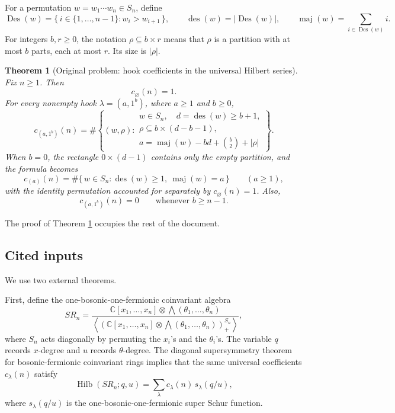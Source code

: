\documentclass[12pt]{article}
\newtheorem{theorem}{Theorem}
\DeclareMathOperator{\Hilb}{Hilb}
\DeclareMathOperator{\Des}{Des}
\DeclareMathOperator{\des}{des}
\DeclareMathOperator{\maj}{maj}
\begin{document}
For a permutation \(w=w_1\cdots w_n\in S_n\), define
\[
\Des(w)=\{\,i\in\{1,\ldots,n-1\}:w_i>w_{i+1}\,\},
\qquad
\des(w)=|\Des(w)|,
\qquad
\maj(w)=\sum_{i\in\Des(w)}i.
\]
For integers \(b,r\ge 0\), the notation \(\rho\subseteq b\times r\) means that \(\rho\) is a partition with at most \(b\) parts, each at most \(r\).  Its size is \(|\rho|\).

\begin{theorem}[Original problem: hook coefficients in the universal Hilbert series]\label{thm:main}
Fix \(n\ge 1\).  Then
\[
c_{\varnothing}(n)=1.
\]
For every nonempty hook \(\lambda=(a,1^b)\), where \(a\ge 1\) and \(b\ge 0\),
\[
\boxed{
c_{(a,1^b)}(n)
=
\#\left\{
(w,\rho):
\begin{array}{l}
w\in S_n,\quad d=\des(w)\ge b+1,\\[2pt]
\rho\subseteq b\times(d-b-1),\\[2pt]
a=\maj(w)-bd+\binom{b}{2}+|\rho|
\end{array}
\right\}.
}
\]
When \(b=0\), the rectangle \(0\times(d-1)\) contains only the empty partition, and the formula becomes
\[
c_{(a)}(n)
=
\#\{\,w\in S_n:\des(w)\ge 1,\ \maj(w)=a\,\}
\qquad (a\ge 1),
\]
with the identity permutation accounted for separately by \(c_{\varnothing}(n)=1\).  Also,
\[
c_{(a,1^b)}(n)=0
\qquad\text{whenever } b\ge n-1.
\]
\end{theorem}

The proof of Theorem \ref{thm:main} occupies the rest of the document.

\subsection{Cited inputs}

We use two external theorems.

First, define the one-bosonic-one-fermionic coinvariant algebra
\[
SR_n
=
\frac{\mathbb C[x_1,\ldots,x_n]\otimes \bigwedge(\theta_1,\ldots,\theta_n)}
{\left\langle
\left(\mathbb C[x_1,\ldots,x_n]\otimes \bigwedge(\theta_1,\ldots,\theta_n)\right)^{S_n}_{+}
\right\rangle},
\]
where \(S_n\) acts diagonally by permuting the \(x_i\)'s and the \(\theta_i\)'s.  The variable \(q\) records \(x\)-degree and \(u\) records \(\theta\)-degree.  The diagonal supersymmetry theorem for bosonic-fermionic coinvariant rings \cite{Lentfer2025} implies that the same universal coefficients \(c_\lambda(n)\) satisfy
\begin{equation}\label{eq:diagonal-supersymmetry}
\Hilb(SR_n;q,u)
=
\sum_\lambda c_\lambda(n)\,s_\lambda(q/u),
\end{equation}
where \(s_\lambda(q/u)\) is the one-bosonic-one-fermionic super Schur function.
\end{document}
